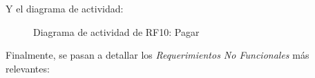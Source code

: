 \begin{itemize}
	Y el diagrama de actividad:
	
	\begin{figure}[!htb]
		\centering
		\caption{Diagrama de actividad de RF10: Pagar}
		\label{fig:diagramaActividad_RF10}
	\end{figure}
	
	\FloatBarrier

\end{itemize}

Finalmente, se pasan a detallar los \emph{Requerimientos No Funcionales} más relevantes:


